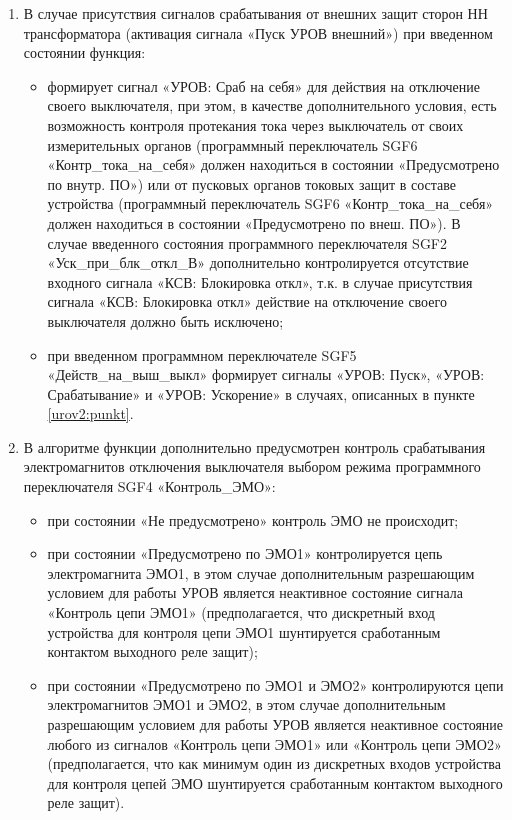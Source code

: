 \begin{enumerate}
\item
В случае присутствия сигналов срабатывания от внешних защит сторон НН трансформатора (активация сигнала «Пуск УРОВ внешний») при введенном состоянии функция: 
\begin{itemize}
	\item формирует сигнал «УРОВ: Сраб на себя» для действия на отключение своего выключателя, при этом, в качестве дополнительного условия, есть возможность контроля протекания тока через выключатель от своих измерительных органов (программный переключатель SGF6 «Контр\_тока\_на\_себя» должен находиться в состоянии «Предусмотрено по внутр. ПО») или от пусковых органов токовых защит в составе устройства (программный переключатель SGF6 «Контр\_тока\_на\_себя» должен находиться в состоянии «Предусмотрено по внеш. ПО»). В случае введенного состояния программного переключателя SGF2 «Уск\_при\_блк\_откл\_В» дополнительно контролируется отсутствие входного сигнала «КСВ: Блокировка откл», т.к. в случае присутствия сигнала «КСВ: Блокировка откл» действие на отключение своего выключателя должно быть исключено;
	\item при введенном программном переключателе SGF5 «Действ\_на\_выш\_выкл» формирует сигналы «УРОВ: Пуск», «УРОВ: Срабатывание» и «УРОВ: Ускорение» в случаях, описанных в пункте \ref{urov2:punkt}.
\end{itemize}

\item
В алгоритме функции дополнительно предусмотрен контроль срабатывания электромагнитов отключения выключателя выбором режима программного переключателя SGF4 «Контроль\_ЭМО»:
\begin{itemize}
	\item при состоянии «Не предусмотрено» контроль ЭМО не происходит;
	\item при состоянии «Предусмотрено по ЭМО1» контролируется цепь электромагнита ЭМО1, в этом случае дополнительным разрешающим условием для работы УРОВ является неактивное состояние сигнала «Контроль цепи ЭМО1» (предполагается, что дискретный вход устройства для контроля цепи ЭМО1 шунтируется сработанным контактом выходного реле защит);
	\item при состоянии «Предусмотрено по ЭМО1 и ЭМО2» контролируются цепи электромагнитов ЭМО1 и ЭМО2, в этом случае дополнительным разрешающим условием для работы УРОВ является неактивное состояние любого из сигналов «Контроль цепи ЭМО1» или «Контроль цепи ЭМО2» (предполагается, что как минимум один из дискретных входов устройства для контроля цепей ЭМО шунтируется сработанным контактом выходного реле защит).
\end{itemize}


\end{enumerate}
